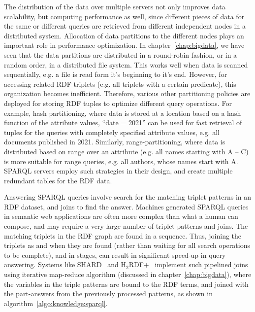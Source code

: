  
The distribution of the data over multiple servers not only improves data scalability, but computing performance as well, since
different pieces of data for the same or different queries are retrieved from different independent nodes in a distributed system.
Allocation of data partitions to the different nodes plays an important role in performance optimization. In chapter~\ref{chap:bigdata},
we have seen that the data partitions are distributed in a round-robin fashion, or in a random order, in a distributed file system.
This works well when data is scanned sequentially, e.g. a file is read form it's beginning to it's end. However, for accessing related 
RDF triplets (e.g. all triplets with a certain predicate), this organization becomes inefficient. Therefore, various other partitioning 
policies are deployed for storing RDF tuples to optimize different query operations. For example, hash partitioning, where data 
is stored at a location based on a hash function of the attribute values, ``date = 2021'' can be used for fast retrieval of tuples 
for the queries with completely specified attribute values, e.g. all documents published in 2021. Similarly, range-partitioning, 
where data is distributed based on range over an attribute (e.g. all names starting with A -- C) is more suitable for range queries, 
e.g. all authors, whose names start with A. SPARQL servers employ such strategies in their design, and create multiple redundant
tables for the RDF data. 

   
Answering SPARQL queries involve search for the matching triplet patterns in an RDF dataset, and joins to find the answer. 
Machines generated SPARQL queries in semantic web applications are often more complex than what a human can compose, and may
require a very large number of triplet patterns and joins. The matching triplets in the RDF graph are found in a sequence. Thus, 
joining the triplets as and when they are found (rather than waiting for all search operations to be complete), and in stages,
can result in significant speed-up in query answering. Systems like SHARD~\citep{Rohloff:2010} and H$_2$RDF+~\citep{Papailiou:2014} 
implement such pipelined joins using iterative map-reduce algorithm (discussed in chapter~\ref{chap:bigdata}),
where the variables in the triple patterns are bound to the RDF terms, and joined with the part-answers from the previously processed
patterns, as shown in algorithm~\ref{algo:knowledge:sparql}.

